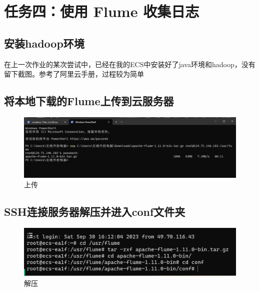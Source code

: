 \section{任务四：使用 Flume 收集日志}
\subsection{安装hadoop环境}
在上一次作业的某次尝试中，已经在我的ECS中安装好了java环境和hadoop，没有留下截图。参考了阿里云手册，过程较为简单\\


\subsection{将本地下载的Flume上传到云服务器}
\begin{figure}[H]
  \centering
  \includegraphics[width=\textwidth]{figure/11.png}
  \caption{上传}
  \label{fig:my_label}
\end{figure}

\subsection{SSH连接服务器解压并进入conf文件夹}
\begin{figure}[H]
  \centering
  \includegraphics[width=\textwidth]{figure/12.png}
  \caption{解压}
  \label{fig:my_label}
\end{figure}

